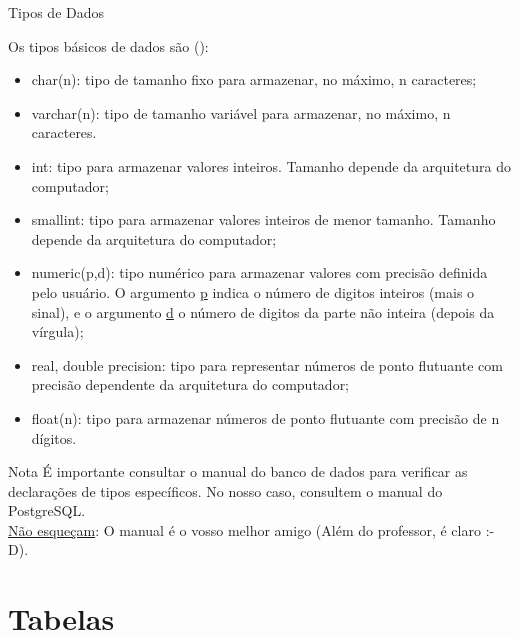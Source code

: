 \documentclass[xcolor=x11names,compress]{beamer}
\begin{document}
\begin{frame}[allowframebreaks]{Tipos de Dados}

Os tipos básicos de dados são (\cite{SilberchatzEtAl2011}):

\begin{itemize}
\itemsep 5mm

\item char(n): tipo de tamanho fixo para armazenar, no máximo, n caracteres; 

\item varchar(n): tipo de tamanho variável para armazenar, no máximo, n caracteres.

\item int: tipo para armazenar valores inteiros. Tamanho depende da arquitetura do computador;

\item smallint: tipo para armazenar valores inteiros de menor tamanho. Tamanho depende da  arquitetura do computador;

\item numeric(p,d): tipo numérico para armazenar valores com precisão definida pelo usuário. O argumento \underline{p} indica o número de digitos inteiros (mais o sinal), e o argumento \underline{d} o número de digitos da parte não inteira (depois da vírgula); 

\item real, double precision: tipo para representar números de ponto flutuante com precisão dependente da arquitetura do computador;

\item float(n): tipo para armazenar números de ponto flutuante com precisão de n dígitos.

\end{itemize}

\begin{alertblock}{\centering Nota}
É importante consultar o manual do banco de dados para verificar as declarações de tipos específicos. No nosso caso, consultem o manual do PostgreSQL. \\[5mm] \underline{Não esqueçam}: O manual é o vosso melhor amigo (Além do professor, é claro :-D). 
\end{alertblock}

\end{frame}

\section{Tabelas}
\end{document}
